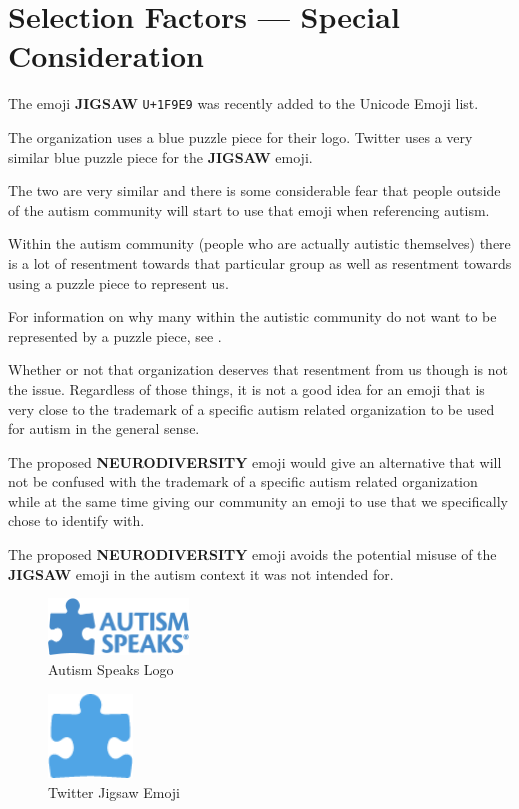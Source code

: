 \section{Selection Factors --- Special Consideration}

The emoji \textbf{JIGSAW} \texttt{U+1F9E9} was recently added to the Unicode Emoji list.

The organization  uses a blue puzzle piece for their logo. Twitter uses a very similar blue puzzle piece for the \textbf{JIGSAW} emoji.

The two are very similar and there is some considerable fear that people outside of the autism community will start to use that emoji when referencing autism.

Within the autism community (people who are actually autistic themselves) there is a lot of resentment towards that particular group as well as resentment towards using a puzzle piece to represent us.

For information on why many within the autistic community do not want to be represented by a puzzle piece, see .

Whether or not that organization deserves that resentment from us though is not the issue. Regardless of those things, it is not a good idea for an emoji that is very close to the trademark of a specific autism related organization to be used for autism in the general sense.

The proposed \textbf{NEURODIVERSITY} emoji would give an alternative that will not be confused with the trademark of a specific autism related organization while at the same time giving our community an emoji to use that we specifically chose to identify with.

The proposed \textbf{NEURODIVERSITY} emoji avoids the potential misuse of the \textbf{JIGSAW} emoji in the autism context it was not intended for.

\begin{figure}[ht]
\caption{Autism Speaks Logo}
\centering
\includegraphics[width=0.333\textwidth]{aspeaks}
\end{figure}

\begin{figure}[ht]
\caption{Twitter Jigsaw Emoji}
\centering
\includegraphics[width=0.2\textwidth]{twitterJigsaw}
\end{figure}
